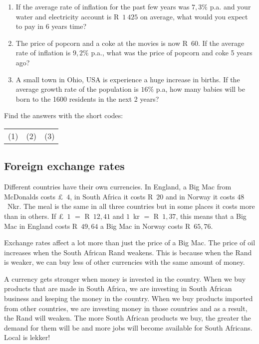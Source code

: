 \begin{exercises}{}{
    \begin{enumerate}[label=\textbf{\arabic*}.]
	\item If the average rate of inflation for the past few years was $7,3\%$ p.a. and your water and electricity account is R~$1~425$ on average, what would you expect to pay in 6 years time?

	\item The price of popcorn and a coke at the movies is now R~$60$. If the average rate of inflation is $9,2\%$ p.a., what was the price of popcorn and coke 5 years ago?

	\item A small town in Ohio, USA is experience a huge increase in births. If the average growth rate of the population is $16\%$ p.a, how many babies will be born to the 1600 residents in the next 2 years?\\
    \end{enumerate}
\practiceinfo
    Find the answers with the short codes:\\
    \begin{tabularx}{\textwidth}{ XXX }
	(1)	&	(2)	&	(3)\\
    \end{tabularx}
}
\end{exercises}



\subsection{Foreign exchange rates}

Different countries have their own currencies. In England, a Big Mac from McDonalds costs £~$4$, in South Africa it costs R~$20$ and in Norway it costs $48$~Nkr. The meal is the same in all three countries but in some places it costs more than in others. If £~$1$ $=$ R~$12,41$ and $1$~kr $=$ R~$1,37$, this means that a Big Mac in England costs R~$49,64$ a Big Mac in Norway costs R~$65,76$.\par

Exchange rates affect a lot more than just the price of a Big Mac. The price of oil increases when the South African Rand weakens. This is because when the Rand is weaker, we can buy less of other currencies with the same amount of money.\par

A currency gets stronger when money is invested in the country. When we buy products that are made in South Africa, we are investing in South African business and keeping the money in the country. When we buy products imported from other countries, we are investing money in those countries and as a result, the Rand will weaken. The more South African products we buy, the greater the demand for them will be and more jobs will become available for South Africans. Local is lekker!

